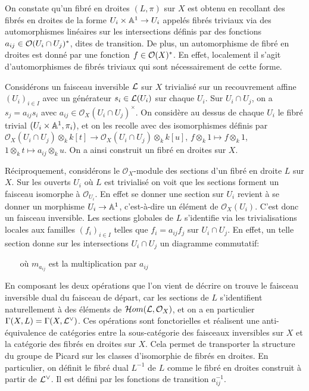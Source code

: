 On constate qu'un fibré en droites $(L,\pi)$ sur $X$ est obtenu en recollant des fibrés en droites de la forme $U_i\times \mathbb{A}^1\rightarrow U_i$ appelés fibrés triviaux via des automorphismes linéaires sur les intersections définis par des fonctions $a_{ij}\in \mathcal{O}(U_i\cap U_j)^*$, dites de transition. De plus, un automorphisme de fibré en droites est donné par une fonction $f\in \mathcal{O}(X)^*$. En effet, localement il s'agit d'automorphismes de fibrés triviaux qui sont nécessairement de cette forme.

Considérons un faisceau inversible $\mathcal{L}$ sur $X$ trivialisé sur un recouvrement affine $(U_i)_{i\in I}$ avec un générateur $s_i\in\mathcal{L}(U_i)$ sur chaque $U_i$. Sur $U_i\cap U_j$, on a $s_j=a_{ij}s_i$ avec $a_{ij} \in \mathcal{O}_X(U_i\cap U_j)^\times$. On considère au dessus de chaque $U_i$ le fibré trivial $(U_i\times\mathbb{A}^1, \pi_i)$, et on les recolle avec des isomorphismes définis par $\mathcal{O}_X(U_i\cap U_j)\otimes_k k[t]\rightarrow \mathcal{O}_X(U_i\cap U_j)\otimes_k k[u]$, $f\otimes_k 1\mapsto f\otimes_k 1$, $1 \otimes_k t \mapsto a_{ij}\otimes_k u$. On a ainsi construit un fibré en droites sur $X$.

Réciproquement, considérons le $\mathcal{O}_X$-module des sections d'un fibré en droite $L$ sur $X$. Sur les ouverts $U_i$ où $L$ est trivialisé on voit que les sections forment un faisceau isomorphe à $\mathcal{O}_{U_i}$. En effet se donner une section sur $U_i$ revient à se donner un morphisme $U_i\rightarrow \mathbb{A}^1$, c'est-à-dire un élément de $\mathcal{O}_X(U_i)$. C'est donc un faisceau inversible. Les sections globales de $L$ s'identifie via les trivialisations locales aux familles $(f_i)_{i\in I}$ telles que $f_i=a_{ij}f_j$ sur $U_i\cap U_j$. En effet, un telle section donne sur les intersections $U_i\cap U_j$ un diagramme commutatif:

	\begin{center}
	$\,\,\,\,\,\,\,\,\,$ où $m_{a_{ij}}$ est la multiplication par $a_{ij}$ 
	\end{center}

En composant les deux opérations que l'on vient de décrire on trouve le faisceau inversible dual du faisceau de départ, car les sections de $L$ s'identifient naturellement à des éléments de $\mathcal{H} om(\mathcal{L},\mathcal{O}_X)$, et on a en particulier $\Gamma(X,L)=\Gamma(X,\mathcal{L}^\vee)$. Ces opérations sont fonctorielles et réalisent une anti-équivalence de catégories entre la sous-catégorie des faisceaux inversibles sur $X$ et la catégorie des fibrés en droites sur $X$. Cela permet de transporter la structure du groupe de Picard sur les classes d'isomorphie de fibrés en droites. En particulier, on définit le fibré dual $L^{-1}$ de $L$ comme le fibré en droites construit à partir de $\mathcal{L}^\vee$. Il est défini par les fonctions de transition $a_{ij}^{-1}$.


